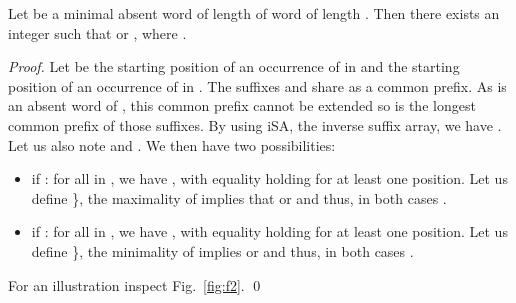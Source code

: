 \documentclass{llncs}
\newcommand{\iSA}{\textsf{iSA}}
\begin{document}
\begin{lemma} 
\label{lem:f2}
  Let  be a minimal absent word of length  of word  of length . Then there exists an integer  
such that \textnormal{} or \textnormal{}, where .
\end{lemma}
\begin{proof}
  Let  be the starting position of an occurrence of  in  and  the starting position of an occurrence of  in .
  The suffixes  and  share  as a common prefix.
  As  is an absent word of , this common prefix cannot be extended so  is the longest common prefix of those suffixes.
  By using \iSA{}, the inverse suffix array, we have . Let us also note 
  and . We then have two possibilities:
\begin{itemize}
  \item if : \quad for all  in , we have
    , with equality holding for at least one position.
        Let us define   \},
    the maximality of  implies that  or  and thus, in both cases
    .
  \item if  : \quad for all  in , we have
    , with equality holding for at least one position.
        Let us define   \}, 
        the minimality of  implies  or  and thus, in both cases
    .
\end{itemize}
For an illustration inspect Fig.~\ref{fig:f2}. \qed
\end{proof}
\end{document}

